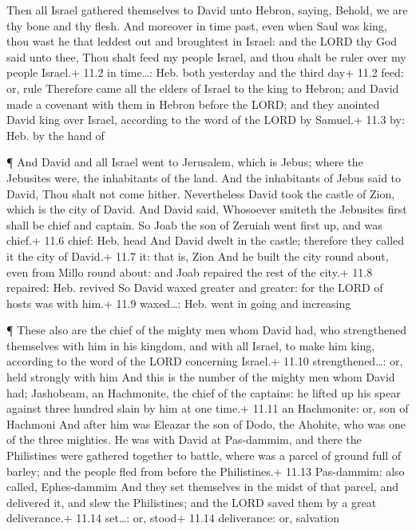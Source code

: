  Then all Israel gathered themselves to David unto Hebron,
saying, Behold, we are thy bone and thy flesh.  And moreover
in time past, even when Saul was king, thou wast he that leddest out and
broughtest in Israel: and the LORD thy God said unto thee, Thou shalt
feed my people Israel, and thou shalt be ruler over my people Israel.+
11.2 in time\ldots: Heb. both yesterday and the third day+ 11.2 feed:
or, rule  Therefore came all the elders of Israel to the
king to Hebron; and David made a covenant with them in Hebron before the
LORD; and they anointed David king over Israel, according to the word of
the LORD by Samuel.+ 11.3 by: Heb. by the hand of

 ¶ And David and all Israel went to Jerusalem, which is
Jebus; where the Jebusites were, the inhabitants of the land.
 And the inhabitants of Jebus said to David, Thou shalt not
come hither. Nevertheless David took the castle of Zion, which is the
city of David.  And David said, Whosoever smiteth the
Jebusites first shall be chief and captain. So Joab the son of Zeruiah
went first up, and was chief.+ 11.6 chief: Heb. head  And
David dwelt in the castle; therefore they called it the city of David.+
11.7 it: that is, Zion  And he built the city round about,
even from Millo round about: and Joab repaired the rest of the city.+
11.8 repaired: Heb. revived  So David waxed greater and
greater: for the LORD of hosts was with him.+ 11.9 waxed\ldots: Heb.
went in going and increasing

 ¶ These also are the chief of the mighty men whom David
had, who strengthened themselves with him in his kingdom, and with all
Israel, to make him king, according to the word of the LORD concerning
Israel.+ 11.10 strengthened\ldots: or, held strongly with him
 And this is the number of the mighty men whom David had;
Jashobeam, an Hachmonite, the chief of the captains: he lifted up his
spear against three hundred slain by him at one time.+ 11.11 an
Hachmonite: or, son of Hachmoni  And after him was Eleazar
the son of Dodo, the Ahohite, who was one of the three mighties.
 He was with David at Pas-dammim, and there the Philistines
were gathered together to battle, where was a parcel of ground full of
barley; and the people fled from before the Philistines.+ 11.13
Pas-dammim: also called, Ephes-dammim  And they set
themselves in the midst of that parcel, and delivered it, and slew the
Philistines; and the LORD saved them by a great deliverance.+ 11.14
set\ldots: or, stood+ 11.14 deliverance: or, salvation

